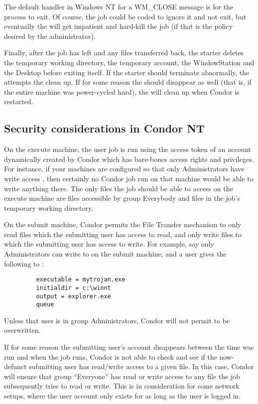 \Note The default handler in Windows NT for a WM\_CLOSE message is for the
process to exit.  Of course, the job could be coded to ignore it and not
exit, but eventually the  will get impatient and hard-kill
the job (if that is the policy desired by the administrator).

Finally, after the job has left and any files transferred back,
the starter
deletes the temporary working directory, the temporary
account, the WindowStation and the Desktop before exiting itself.
If the starter should terminate abnormally, the 
attempts the clean up.
If for some reason the  should disappear as well
(that is, if the entire machine was power-cycled hard),
the  will clean up when Condor is restarted.

\subsection{Security considerations in Condor NT}

On the execute machine, the user job is run using the access token of an
account dynamically created by Condor which has bare-bones access rights and
privileges.  For instance, if your machines are configured so that only
Administrators have write access , then certainly no
Condor job run on that machine would be able to write anything there.  The
only files the job should be able to access on the execute machine are files
accessible by group Everybody and files in the job's temporary working
directory.

On the submit machine, Condor permits the File Transfer mechanism to only
read files which the submitting user has access to read, and only write
files to which the submitting user has access to write.  For example, say
only Administrators can write to  on the submit machine,
and a user gives the following to  :
\begin{verbatim}
         executable = mytrojan.exe
         initialdir = c:\winnt
         output = explorer.exe
         queue
\end{verbatim}
Unless that user is in group Administrators, Condor will not permit
 to be overwritten.  

If for some reason the submitting user's account disappears between the time
 was run and when the job runs, Condor is not able to check
and see if the now-defunct submitting user has read/write access to a given
file.  In this case, Condor will ensure that group ``Everyone'' has read or
write access to any file the job subsequently tries to read or write.  This
is in consideration for some network setups, where the user account only
exists for as long as the user is logged in.

